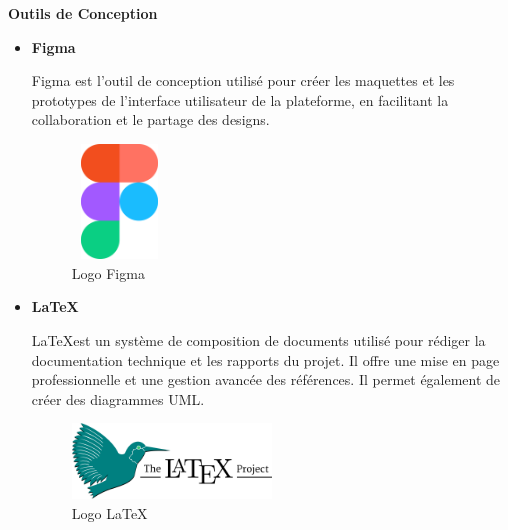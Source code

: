 \textbf{Outils de Conception}
\begin{itemize}
  \item \textbf{Figma}

    Figma est l'outil de conception utilisé pour créer les maquettes et les
    prototypes de l'interface utilisateur de la plateforme, en facilitant la
    collaboration et le partage des designs.

    \begin{figure}[H]
      \centering
      \includegraphics[width=1.0in, height=1.2in]{images/800px-Figma-logo.svg.png}
      \caption{Logo Figma}
    \end{figure}

  \item \textbf{\LaTeX}

    \LaTeX est un système de composition de documents utilisé pour rédiger la
    documentation technique et les rapports du projet. Il offre une mise en
    page professionnelle et une gestion avancée des références. Il permet
    également de créer des diagrammes UML.

    \begin{figure}[H]
      \centering
      \includegraphics[width=0.5\textwidth]{images/LaTeX_project_logo_bird.svg.png}
      \caption{Logo \LaTeX}
    \end{figure}
\end{itemize}

